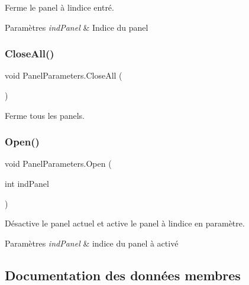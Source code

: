 Ferme le panel à l\textquotesingle{}indice entré. 


\begin{DoxyParams}{Paramètres}
{\em ind\+Panel} & Indice du panel\\
\hline
\end{DoxyParams}
\mbox{\label{class_panel_parameters_acd85be34f18d47bef829a55a0acd76bf}} 
\subsubsection{\texorpdfstring{Close\+All()}{CloseAll()}}
{\footnotesize\ttfamily void Panel\+Parameters.\+Close\+All (\begin{DoxyParamCaption}{ }\end{DoxyParamCaption})\hspace{0.3cm}{\ttfamily [inline]}}



Ferme tous les panels. 

\mbox{\label{class_panel_parameters_aec94ac0de16ac853bd93ee2059e65e78}} 
\subsubsection{\texorpdfstring{Open()}{Open()}}
{\footnotesize\ttfamily void Panel\+Parameters.\+Open (\begin{DoxyParamCaption}\item[{int}]{ind\+Panel }\end{DoxyParamCaption})\hspace{0.3cm}{\ttfamily [inline]}}



Désactive le panel actuel et active le panel à l\textquotesingle{}indice en paramètre. 


\begin{DoxyParams}{Paramètres}
{\em ind\+Panel} & indice du panel à activé\\
\hline
\end{DoxyParams}


\subsection{Documentation des données membres}
\mbox{\label{class_panel_parameters_a3adf5d5f6e86c189cace2e20f15e3c95}} 
